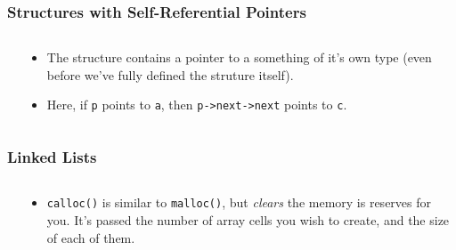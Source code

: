 
\begin{frame}[fragile]
\frametitle{Structures with Self-Referential Pointers}
\begin{columns}[T]

\begin{column}{0.45\textwidth}

\end{column}

\pause
\begin{column}{0.45\textwidth}
\begin{itemize}[<+->]
\item The structure contains a pointer to a something of it's own type (even before we've fully defined the struture itself).
\item Here, if \verb^p^ points to \verb^a^, then \verb^p->next->next^ points to \verb^c^.
\end{itemize}
\end{column}

\end{columns}
\end{frame}



\begin{frame}[fragile]
\frametitle{Linked Lists}
\begin{columns}[T]

\begin{column}{0.45\textwidth}

\end{column}

\pause
\begin{column}{0.45\textwidth}

\begin{itemize}[<+->]
\item \verb^calloc()^ is similar to \verb^malloc()^, but {\em clears} the memory is reserves for you. It's passed the number of array cells you wish to create, and the size of each of them.
\end{itemize}
\end{column}

\end{columns}
\end{frame}


